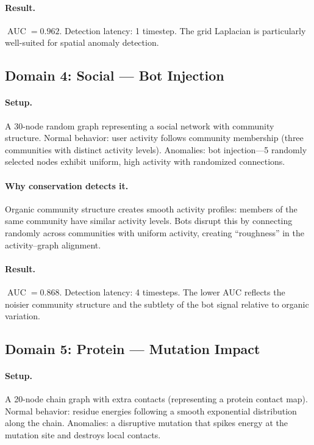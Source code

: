 \documentclass[11pt,a4paper]{article}
\DeclareMathOperator{\AUC}{AUC}
\begin{document}
\paragraph{Result.} $\AUC = 0.962$.  Detection latency: 1 timestep.  The grid
Laplacian is particularly well-suited for spatial anomaly detection.

\subsection{Domain 4: Social --- Bot Injection}

\paragraph{Setup.} A 30-node random graph representing a social network with
community structure.  Normal behavior: user activity follows community membership
(three communities with distinct activity levels).  Anomalies: bot injection---5
randomly selected nodes exhibit uniform, high activity with randomized connections.

\paragraph{Why conservation detects it.} Organic community structure creates
smooth activity profiles: members of the same community have similar activity
levels.  Bots disrupt this by connecting randomly across communities with uniform
activity, creating ``roughness'' in the activity--graph alignment.

\paragraph{Result.} $\AUC = 0.868$.  Detection latency: 4 timesteps.  The lower
AUC reflects the noisier community structure and the subtlety of the bot signal
relative to organic variation.

\subsection{Domain 5: Protein --- Mutation Impact}

\paragraph{Setup.} A 20-node chain graph with extra contacts (representing a
protein contact map).  Normal behavior: residue energies following a smooth
exponential distribution along the chain.  Anomalies: a disruptive mutation that
spikes energy at the mutation site and destroys local contacts.
\end{document}
